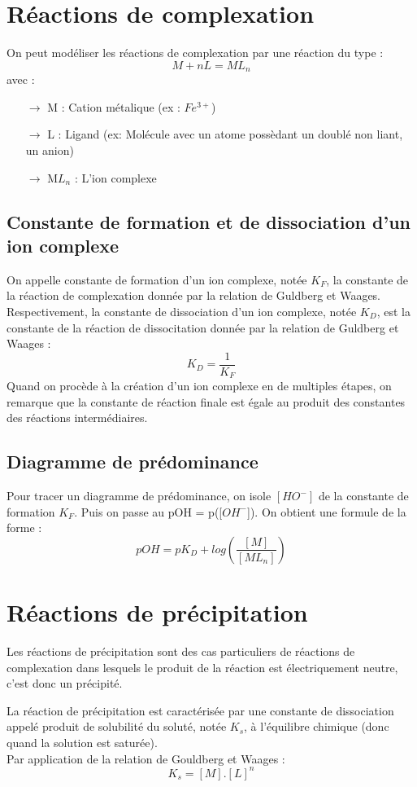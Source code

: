 \section{Réactions de complexation}
On peut modéliser les réactions de complexation par une réaction du type :
$$M + nL = ML_n$$
avec :
\begin{itemize}
 \item[$\rightarrow$] M : Cation métalique (ex : $Fe^{3+}$)
 \item[$\rightarrow$] L : Ligand (ex: Molécule avec un atome possèdant un doublé non liant, un anion)
 \item[$\rightarrow$] M$L_n$ : L'ion complexe
\end{itemize}
\subsection{Constante de formation et de dissociation d'un ion complexe}
On appelle constante de formation d'un ion complexe, notée $K_F$, la constante de la réaction de complexation donnée par la relation de Guldberg et Waages.\\
Respectivement, la constante de dissociation d'un ion complexe, notée $K_D$, est la constante de la réaction de dissocitation donnée par la relation de Guldberg et Waages :
$$K_D = \dfrac{1}{K_F}$$
Quand on procède à la création d'un ion complexe en de multiples étapes, on remarque que la constante de réaction finale est égale au produit des constantes des réactions intermédiaires.
\subsection{Diagramme de prédominance}
Pour tracer un diagramme de prédominance, on isole $[HO^-]$ de la constante de formation $K_F$. Puis on passe au pOH = p([$OH^-$]). On obtient une formule de la forme :
$$pOH = pK_D + log\left( \dfrac{[M]}{[ML_n]}\right) $$
\section{Réactions de précipitation}
\begin{de}
Les réactions de précipitation sont des cas particuliers de réactions de complexation dans lesquels le produit de la réaction est électriquement neutre, c'est donc un précipité.
\end{de}
La réaction de précipitation est caractérisée par une constante de dissociation appelé produit de solubilité du soluté, notée $K_s$, à l'équilibre chimique (donc quand la solution est saturée).\\
Par application de la relation de Gouldberg et Waages :
$$K_s = [M].[L]^n$$ 
